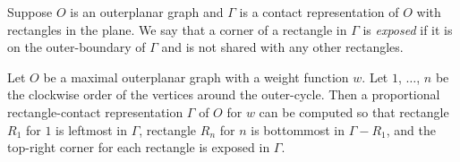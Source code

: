 \documentclass{llncs}
\newenvironment{sketch}{\medskip\noindent{\bf Proof Sketch:}}{\mbox{}\hfill\qed\par}
\begin{document}
Suppose $O$ is an outerplanar graph and $\Gamma$ is a contact representation of $O$ with rectangles
 in the plane. We say that a corner of a rectangle in $\Gamma$ is \textit{exposed} if it is
 on the outer-boundary of $\Gamma$ and is not shared with any other rectangles.





\begin{lemma}
\label{lem:stair}
	Let $O$ be a maximal outerplanar graph with a weight function $w$. Let
	$1$, $\ldots$, $n$ be the clockwise order of the vertices around the
	outer-cycle. Then a proportional rectangle-contact representation $\Gamma$ of
	$O$ for $w$ can be computed so that rectangle $R_1$
	for $1$ is leftmost in $\Gamma$, rectangle $R_n$ for $n$ is
        bottommost in $\Gamma - R_1$, and the top-right corner for each rectangle is exposed in $\Gamma$.
\end{lemma}
\begin{comment}
	\begin{figure}[t]
\centering
		\texttt{[image: stair.pdf]}
		\caption{Illustration for the proof of Lemma~\ref{lem:stair}.}
	\label{fig:stair}
	\end{figure}
\begin{sketch}
Constructing $\Gamma$ is easy when $G$ is a single edge $(1,n)$, so
let $G$ contain at least 3 vertices. Let $x$ be the unique vertex adjacent to $(1,n)$. Denote by
 $G[1,x]$ the graph induced by all vertices between $1$ and $x$ and by $G[x,n]$ the graph
 induced by the vertices between $x$ and $n$. Recursively draw $G[1,x]$ and $G[x,n]$ and
 remove the rectangles for $1$, $x$, $n$ to find the drawings $\Gamma_1$ and $\Gamma_2$,
 respectively. Finally draw the rectangles $R_1$, $R_x$ and $R_n$ for $1$, $x$ and $n$,
 with the required areas and place $\Gamma_1$ (after possible scaling) between
 $R_1$, $R_x$ and $\Gamma_2$ (after possible scaling)  between $R_x$, $R_n$ to complete
 the drawing; see Fig.~\ref{fig:stair}.
\end{sketch}
\end{comment}
\end{document}
